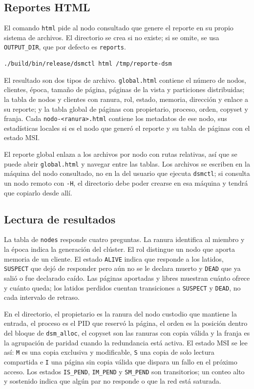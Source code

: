 \subsection{Reportes HTML}\label{subsec:reportes-html}

El comando \texttt{html} pide al nodo consultado que genere el reporte en su propio sistema de archivos. El directorio se crea si no existe; si se omite, se usa \texttt{OUTPUT\_DIR}, que por defecto es \texttt{reports}.

\begin{lstlisting}
./build/bin/release/dsmctl html /tmp/reporte-dsm
\end{lstlisting}

El resultado son dos tipos de archivo. \texttt{global.html} contiene el número de nodos, clientes, época, tamaño de página, páginas de la vista y particiones distribuidas; la tabla de nodos y clientes con ranura, rol, estado, memoria, dirección y enlace a su reporte; y la tabla global de páginas con propietario, proceso, orden, copyset y franja. Cada \texttt{nodo-<ranura>.html} contiene los metadatos de ese nodo, sus estadísticas locales si es el nodo que generó el reporte y su tabla de páginas con el estado MSI.

El reporte global enlaza a los archivos por nodo con rutas relativas, así que se puede abrir \texttt{global.html} y navegar entre las tablas. Los archivos se escriben en la máquina del nodo consultado, no en la del usuario que ejecuta \texttt{dsmctl}; si consulta un nodo remoto con \texttt{-H}, el directorio debe poder crearse en esa máquina y tendrá que copiarlo desde allí.

\subsection{Lectura de resultados}\label{subsec:lectura-resultados}

La tabla de \texttt{nodes} responde cuatro preguntas. La ranura identifica al miembro y la época indica la generación del clúster. El rol distingue un nodo que aporta memoria de un cliente. El estado \texttt{ALIVE} indica que responde a los latidos, \texttt{SUSPECT} que dejó de responder pero aún no se le declara muerto y \texttt{DEAD} que ya salió o fue declarado caído. Las páginas aportadas y libres muestran cuánto ofrece y cuánto queda; los latidos perdidos cuentan transiciones a \texttt{SUSPECT} y \texttt{DEAD}, no cada intervalo de retraso.

En el directorio, el propietario es la ranura del nodo custodio que mantiene la entrada, el proceso es el PID que reservó la página, el orden es la posición dentro del bloque de \texttt{dsm\_alloc}, el copyset son las ranuras con copia válida y la franja es la agrupación de paridad cuando la redundancia está activa. El estado MSI se lee así: \texttt{M} es una copia exclusiva y modificable, \texttt{S} una copia de solo lectura compartida e \texttt{I} una página sin copia válida que dispara un fallo en el próximo acceso. Los estados \texttt{IS\_PEND}, \texttt{IM\_PEND} y \texttt{SM\_PEND} son transitorios; un conteo alto y sostenido indica que algún par no responde o que la red está saturada.

